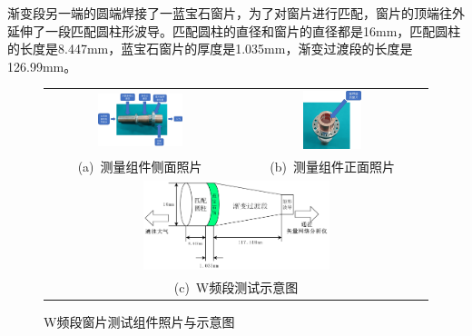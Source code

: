 \documentclass[master]{thesis-uestc}
\begin{document}
渐变段另一端的圆端焊接了一蓝宝石窗片，为了对窗片进行匹配，窗片的顶端往外延伸了一段匹配圆柱形波导。匹配圆柱的直径和窗片的直径都是16mm，匹配圆柱的长度是8.447mm，蓝宝石窗片的厚度是1.035mm，渐变过渡段的长度是126.99mm。
\begin{figure}[!htbp]
    \small
    \centering
    \begin{tabular}{@{\ }c@{\ }c}
        \includegraphics[width=0.47\textwidth]{pic/chapter5/测量喇叭侧面实拍.png} & 
        \hspace{5pt}
        \includegraphics[width=0.32\textwidth]{pic/chapter5/测量喇叭正面实拍.png}     \\
        \mbox{\small (a) 测量组件侧面照片}                                                                               & 
        \mbox{\small (b) 测量组件正面照片}                                                                                  \\[6bp]
        \multicolumn{2}{c}{\includegraphics[width=0.5\textwidth]{pic/chapter5/W频段测试示意图.png}} \\  %
        \multicolumn{2}{c}{\mbox{\small (c) W频段测试示意图}}
    \end{tabular}
    \caption{W频段窗片测试组件照片与示意图}
    \label{fig:W频段窗测试与示意图}
\end{figure}
\end{document}
